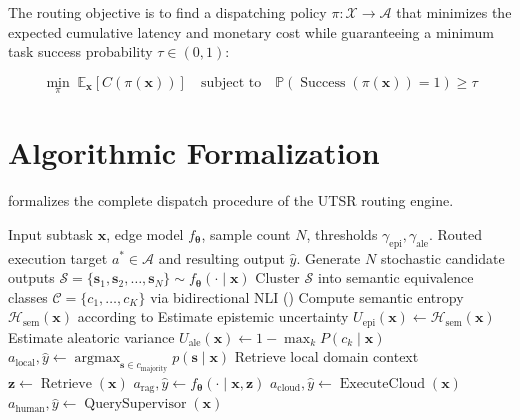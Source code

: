 The routing objective is to find a dispatching policy $\pi: \mathcal{X} \to \mathcal{A}$ that minimizes the expected cumulative latency and monetary cost while guaranteeing a minimum task success probability $\tau \in (0, 1)$:

\begin{equation}
    \min_{\pi} \; \mathbb{E}_{\mathbf{x}}\left[ C(\pi(\mathbf{x})) \right] \quad \text{subject to} \quad \mathbb{P}\left(\operatorname{Success}(\pi(\mathbf{x})) = 1\right) \ge \tau
    \label{eq:optimization_objective}
\end{equation}

\section{Algorithmic Formalization}
\label{sec:method_algorithm}

 formalizes the complete dispatch procedure of the \ac{UTSR} routing engine.

\begin{algorithm}[ht]
\caption{Uncertainty-Type-Driven Subtask Routing (UTSR)}
\label{alg:utsr_routing}
\begin{algorithmic}[1]
\Require Input subtask $\mathbf{x}$, edge model $f_{\boldsymbol{\theta}}$, sample count $N$, thresholds $\gamma_{\text{epi}}, \gamma_{\text{ale}}$.
\Ensure Routed execution target $a^* \in \mathcal{A}$ and resulting output $\hat{y}$.
\State Generate $N$ stochastic candidate outputs $\mathcal{S} = \{\mathbf{s}_1, \mathbf{s}_2, \dots, \mathbf{s}_N\} \sim f_{\boldsymbol{\theta}}(\cdot \mid \mathbf{x})$
\State Cluster $\mathcal{S}$ into semantic equivalence classes $\mathcal{C} = \{c_1, \dots, c_K\}$ via bidirectional NLI ()
\State Compute semantic entropy $\mathcal{H}_{\text{sem}}(\mathbf{x})$ according to 
\State Estimate epistemic uncertainty $U_{\text{epi}}(\mathbf{x}) \leftarrow \mathcal{H}_{\text{sem}}(\mathbf{x})$
\State Estimate aleatoric variance $U_{\text{ale}}(\mathbf{x}) \leftarrow 1 - \max_k P(c_k \mid \mathbf{x})$
    \State \Return $a_{\text{local}}, \hat{y} \leftarrow \operatorname{argmax}_{\mathbf{s} \in c_{\text{majority}}} p(\mathbf{s} \mid \mathbf{x})$ 
    \State Retrieve local domain context $\mathbf{z} \leftarrow \operatorname{Retrieve}(\mathbf{x})$
    \State \Return $a_{\text{rag}}, \hat{y} \leftarrow f_{\boldsymbol{\theta}}(\cdot \mid \mathbf{x}, \mathbf{z})$ 
    \State \Return $a_{\text{cloud}}, \hat{y} \leftarrow \operatorname{ExecuteCloud}(\mathbf{x})$ 
\Else
    \State \Return $a_{\text{human}}, \hat{y} \leftarrow \operatorname{QuerySupervisor}(\mathbf{x})$ 
\EndIf
\end{algorithmic}
\end{algorithm}
